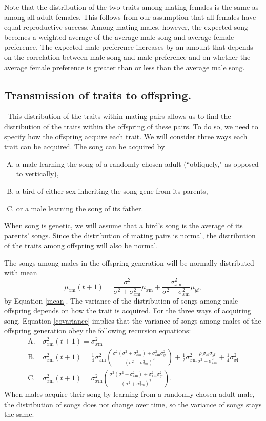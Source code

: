 \documentclass[12pt]{article}
\newcommand{\x}[1]{\text{#1}}
\begin{document}
Note that the distribution of the two traits among mating females is the same as among all adult females. This follows from our assumption that all females have equal reproductive success. Among mating males, however, the expected song becomes a weighted average of the average male song and average female preference. The expected male preference increases by an amount that depends on the correlation between male song and male preference and on whether the average female preference is greater than or less than the average male song.

\subsection*{Transmission of traits to offspring.  } 
\ This distribution of the traits within mating pairs allows us to find the distribution of the traits within the offspring of these pairs. To do so, we need to specify how the offspring acquire each trait. We will consider three ways each trait can be acquired. The song can be acquired by 
\begin{enumerate}[A.]
\item a male learning the song of a randomly chosen adult (``obliquely," as opposed to vertically),
\item a bird of either sex inheriting the song gene from its parents, 
\item or a male learning the song of its father.
\end{enumerate}
When song is genetic, we will assume that a bird's song is the average of its parents' songs. Since the distribution of mating pairs is normal, the distribution of the traits among offspring will also be normal. 

The songs among males in the offspring generation will be normally distributed with mean $$\mu_{x\x{m}}(t+1)=\frac{\sigma^2}{\sigma^2+\sigma_{x\x{m}}^2}\mu_{x\x{m}}+\frac{\sigma_{x\x{m}}^2}{\sigma^2+\sigma_{x\x{m}}^2}\mu_{y\x{f}},$$ by Equation \ref{mean}. The variance of the distribution of songs among male offspring depends on how the trait is acquired. For the three ways of acquiring song, Equation \ref{covariance} implies that the variance of songs among males of the offspring generation obey the following recursion equations: 
\begin{align*}
\x{A.} \ &\sigma_{x\x{m}}^2(t+1)=\sigma_{x\x{m}}^2
\\ \x{B.} \ &\sigma_{x\x{m}}^2(t+1)=\frac{1}{4}\sigma_{x\x{m}}^2\left(\frac{\sigma^2(\sigma^2+\sigma_{x\x{m}}^2)+\sigma_{ x\x{m}}^2\sigma_{y\x{f}}^2}{(\sigma^2+\sigma_{x\x{m}}^2)^2}\right)+\frac{1}{2}\sigma_{x\x{m}}^2\frac{\rho_\x{f}\sigma_{x\x{f}}\sigma_{y\x{f}}}{\sigma^2+\sigma_{x\x{m}}^2}+\frac{1}{4}\sigma_{x\x{f}}^2
\\\x{C.} \ &\sigma_{x\x{m}}^2(t+1)=\sigma_{x\x{m}}^2\left(\frac{\sigma^2(\sigma^2+\sigma_{x\x{m}}^2)+\sigma_{ x\x{m}}^2\sigma_{y\x{f}}^2}{(\sigma^2+\sigma_{x\x{m}}^2)^2}\right).
\end{align*}
When males acquire their song by learning from a randomly chosen adult male, the distribution of songs does not change over time, so the variance of songs stays the same. 
\end{document}
